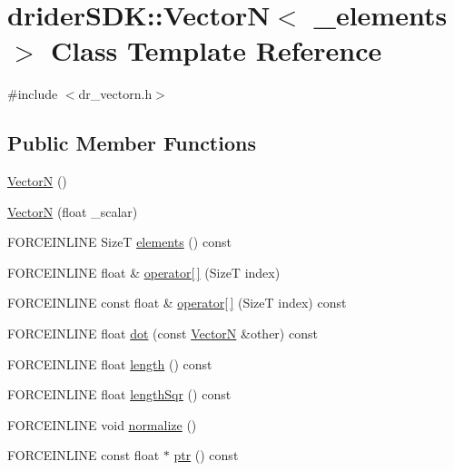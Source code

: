 \hypertarget{classdrider_s_d_k_1_1_vector_n}{}\section{drider\+S\+DK\+:\+:VectorN$<$ \+\_\+elements $>$ Class Template Reference}
\label{classdrider_s_d_k_1_1_vector_n}


{\ttfamily \#include $<$dr\+\_\+vectorn.\+h$>$}

\subsection*{Public Member Functions}
\begin{DoxyCompactItemize}
\item 
\hyperlink{classdrider_s_d_k_1_1_vector_n_a791435c4907a5ed662d12737f446dc3e}{VectorN} ()
\item 
\hyperlink{classdrider_s_d_k_1_1_vector_n_ada33981d7f60f3b1d8a1cfdee2276d77}{VectorN} (float \+\_\+scalar)
\item 
F\+O\+R\+C\+E\+I\+N\+L\+I\+NE SizeT \hyperlink{classdrider_s_d_k_1_1_vector_n_a2aa5dfff2cdcc4ae187905b2fbddfa57}{elements} () const
\item 
F\+O\+R\+C\+E\+I\+N\+L\+I\+NE float \& \hyperlink{classdrider_s_d_k_1_1_vector_n_a8f090f0b90344080de98745f8f2bc6fb}{operator\mbox{[}$\,$\mbox{]}} (SizeT index)
\item 
F\+O\+R\+C\+E\+I\+N\+L\+I\+NE const float \& \hyperlink{classdrider_s_d_k_1_1_vector_n_a39f258b71bfa7e6d5d87f855206e4e28}{operator\mbox{[}$\,$\mbox{]}} (SizeT index) const
\item 
F\+O\+R\+C\+E\+I\+N\+L\+I\+NE float \hyperlink{classdrider_s_d_k_1_1_vector_n_ad48030d3daf764a398547631a348055a}{dot} (const \hyperlink{classdrider_s_d_k_1_1_vector_n}{VectorN} \&other) const
\item 
F\+O\+R\+C\+E\+I\+N\+L\+I\+NE float \hyperlink{classdrider_s_d_k_1_1_vector_n_af753c889a14e3c1a9c65b6069ca74125}{length} () const
\item 
F\+O\+R\+C\+E\+I\+N\+L\+I\+NE float \hyperlink{classdrider_s_d_k_1_1_vector_n_a2bb749769feebfc048289194481a553b}{length\+Sqr} () const
\item 
F\+O\+R\+C\+E\+I\+N\+L\+I\+NE void \hyperlink{classdrider_s_d_k_1_1_vector_n_aaab9e71b71c9f03ffd44e802f3872d0f}{normalize} ()
\item 
F\+O\+R\+C\+E\+I\+N\+L\+I\+NE const float $\ast$ \hyperlink{classdrider_s_d_k_1_1_vector_n_a54fc08312e0789aa3bd7dcb5c2076f4d}{ptr} () const

\end{DoxyCompactItemize}
